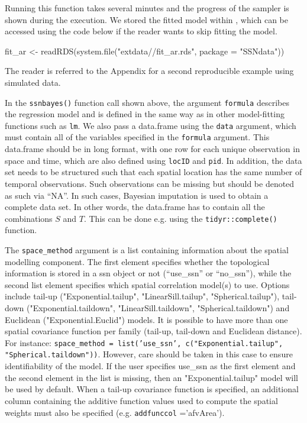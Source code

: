 \noindent Running this function takes several minutes and the progress of the sampler is shown during the execution. We stored the fitted model within , which can be accessed using the code below if the reader wants to skip fitting the model.

\begin{example}
fit_ar <- readRDS(system.file("extdata//fit_ar.rds", package = "SSNdata"))
\end{example}

\noindent The reader is referred to the Appendix for a second reproducible example using simulated data.

In the \texttt{ssnbayes()} function call shown above, the argument \texttt{formula} describes the regression model and is defined in the same way as in other model-fitting functions such as \texttt{lm}. We also pass a data.frame using the \texttt{data} argument, which must contain all of the variables specified in the \texttt{formula} argument. 
This data.frame should be in long format, with one row for each unique observation in space and time, which are also defined using \texttt{locID} and \texttt{pid}. 
In addition, the data set needs to be structured such that each spatial location has the same number of temporal observations.  Such observations can be missing but should be denoted as such via ``NA''.  In such cases, Bayesian imputation is used to obtain a complete data set.
In other words, the data.frame has to contain all the combinations $S$ and $T$. This can be done e.g. using the \texttt{tidyr::complete()} function.

The \texttt{space\_method} argument is a list containing information about the spatial modelling component. The first element specifies whether the topological information is stored in a ssn object or not  (``use\_ssn'' or ``no\_ssn''), while the second list element specifies which spatial correlation model(s) to use. Options include tail-up ("Exponential.tailup", "LinearSill.tailup", "Spherical.tailup"), tail-down ("Exponential.taildown", "LinearSill.taildown", "Spherical.taildown") and 
Euclidean ("Exponential.Euclid") models. 
It is possible to have more than one spatial covariance function per family (tail-up, tail-down and Euclidean distance). For instance: \texttt{space\_method = list('use\_ssn', c("Exponential.tailup", "Spherical.taildown"))}.
However, care should be taken in this case to ensure identifiability of the model.
If the user specifies use\_ssn as the first element and the second element in the list is missing, then an "Exponential.tailup" model will be used by default. When a tail-up covariance function is specified, an additional column containing the additive function values used to compute the spatial weights must also be specified (e.g. \texttt{addfunccol} ='afvArea'). 

